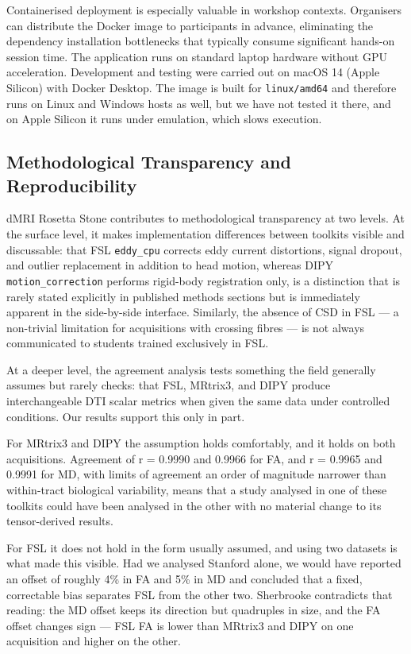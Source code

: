 \documentclass[12pt,a4paper]{article}
\begin{document}
Containerised deployment is especially valuable in workshop contexts. Organisers can distribute the Docker image to participants in advance, eliminating the dependency installation bottlenecks that typically consume significant hands-on session time. The application runs on standard laptop hardware without GPU acceleration. Development and testing were carried out on macOS 14 (Apple Silicon) with Docker Desktop. The image is built for \texttt{linux/amd64} and therefore runs on Linux and Windows hosts as well, but we have not tested it there, and on Apple Silicon it runs under emulation, which slows execution.

\subsection{Methodological Transparency and Reproducibility}\label{methodological-transparency-and-reproducibility}

dMRI Rosetta Stone contributes to methodological transparency at two levels. At the surface level, it makes implementation differences between toolkits visible and discussable: that FSL \texttt{eddy\_cpu} corrects eddy current distortions, signal dropout, and outlier replacement in addition to head motion, whereas DIPY \texttt{motion\_correction} performs rigid-body registration only, is a distinction that is rarely stated explicitly in published methods sections but is immediately apparent in the side-by-side interface. Similarly, the absence of CSD in FSL --- a non-trivial limitation for acquisitions with crossing fibres --- is not always communicated to students trained exclusively in FSL.

At a deeper level, the agreement analysis tests something the field generally assumes but rarely checks: that FSL, MRtrix3, and DIPY produce interchangeable DTI scalar metrics when given the same data under controlled conditions. Our results support this only in part.

For MRtrix3 and DIPY the assumption holds comfortably, and it holds on both acquisitions. Agreement of r = 0.9990 and 0.9966 for FA, and r = 0.9965 and 0.9991 for MD, with limits of agreement an order of magnitude narrower than within-tract biological variability, means that a study analysed in one of these toolkits could have been analysed in the other with no material change to its tensor-derived results.

For FSL it does not hold in the form usually assumed, and using two datasets is what made this visible. Had we analysed Stanford alone, we would have reported an offset of roughly 4\% in FA and 5\% in MD and concluded that a fixed, correctable bias separates FSL from the other two. Sherbrooke contradicts that reading: the MD offset keeps its direction but quadruples in size, and the FA offset changes sign --- FSL FA is lower than MRtrix3 and DIPY on one acquisition and higher on the other.
\end{document}
